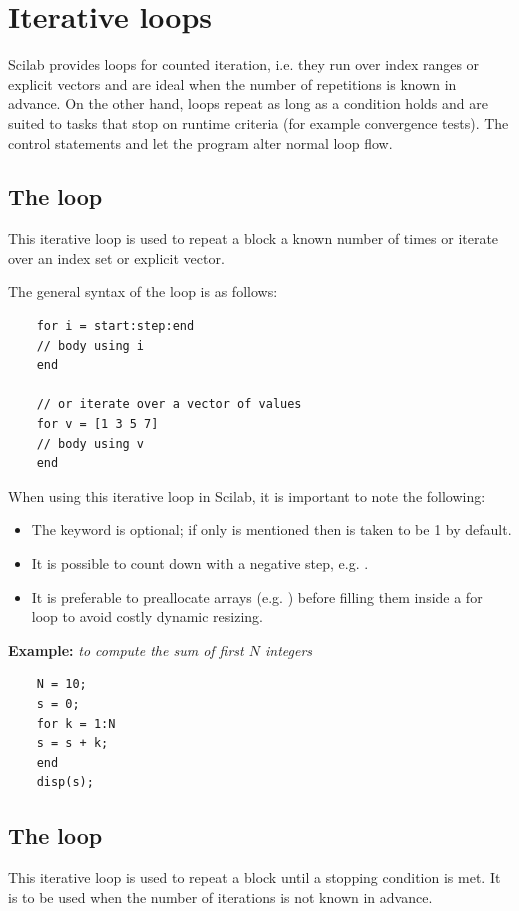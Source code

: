 \section{Iterative loops}
	Scilab provides  loops for counted iteration, i.e. they run over index ranges or explicit vectors and are ideal when the number of repetitions is known in advance. On the other hand,  loops repeat as long as a condition holds and are suited to tasks that stop on runtime criteria (for example convergence tests). The control statements  and  let the program alter normal loop flow.
	
	\subsection{The  loop}
		This iterative loop is used to repeat a block a known number of times or iterate over an index set or explicit vector.
		
		The general syntax of the  loop is as follows:
		\begin{verbatim}
	for i = start:step:end
	// body using i
	end
	
	// or iterate over a vector of values
	for v = [1 3 5 7]
	// body using v
	end
		\end{verbatim}
		When using this iterative loop in Scilab, it is important to note the following:
		\begin{itemize}
			\item The  keyword is optional; if only  is mentioned then  is taken to be 1 by default.
			\item It is possible to count down with a negative step, e.g. .
			\item It is preferable to preallocate arrays (e.g. ) before filling them inside a for loop to avoid costly dynamic resizing.
		\end{itemize}
		
		\textbf{Example:} \textit{to compute the sum of first $N$ integers}
		\begin{verbatim}
	N = 10;
	s = 0;
	for k = 1:N
	s = s + k;
	end
	disp(s);
		\end{verbatim}
		
		\subsection{The  loop}
		This iterative loop is used to repeat a block until a stopping condition is met. It is to be used when the number of iterations is not known in advance.
		
